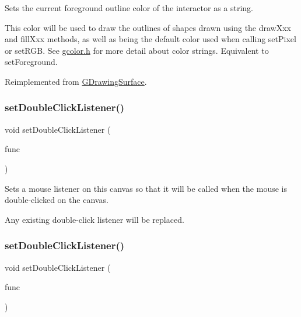 Sets the current foreground outline color of the interactor as a string. 

This color will be used to draw the outlines of shapes drawn using the draw\+Xxx and fill\+Xxx methods, as well as being the default color used when calling set\+Pixel or set\+R\+GB. See \mbox{\hyperlink{gcolor_8h_source}{gcolor.\+h}} for more detail about color strings. Equivalent to set\+Foreground. 

Reimplemented from \mbox{\hyperlink{classGDrawingSurface_a61374df6c11b52cfbb0815decdbaebc6}{G\+Drawing\+Surface}}.

\mbox{\label{classGCanvas_ac29f9a3462458e165fae3a1f046ee77a}} 
\subsubsection{\texorpdfstring{set\+Double\+Click\+Listener()}{setDoubleClickListener()}\hspace{0.1cm}{\footnotesize\ttfamily [1/2]}}
{\footnotesize\ttfamily void set\+Double\+Click\+Listener (\begin{DoxyParamCaption}\item[{G\+Event\+Listener}]{func }\end{DoxyParamCaption})\hspace{0.3cm}{\ttfamily [virtual]}}



Sets a mouse listener on this canvas so that it will be called when the mouse is double-\/clicked on the canvas. 

Any existing double-\/click listener will be replaced. \mbox{\label{classGCanvas_a50096194d66f48c92dd4c512d41bfc76}} 
\subsubsection{\texorpdfstring{set\+Double\+Click\+Listener()}{setDoubleClickListener()}\hspace{0.1cm}{\footnotesize\ttfamily [2/2]}}
{\footnotesize\ttfamily void set\+Double\+Click\+Listener (\begin{DoxyParamCaption}\item[{G\+Event\+Listener\+Void}]{func }\end{DoxyParamCaption})\hspace{0.3cm}{\ttfamily [virtual]}}



